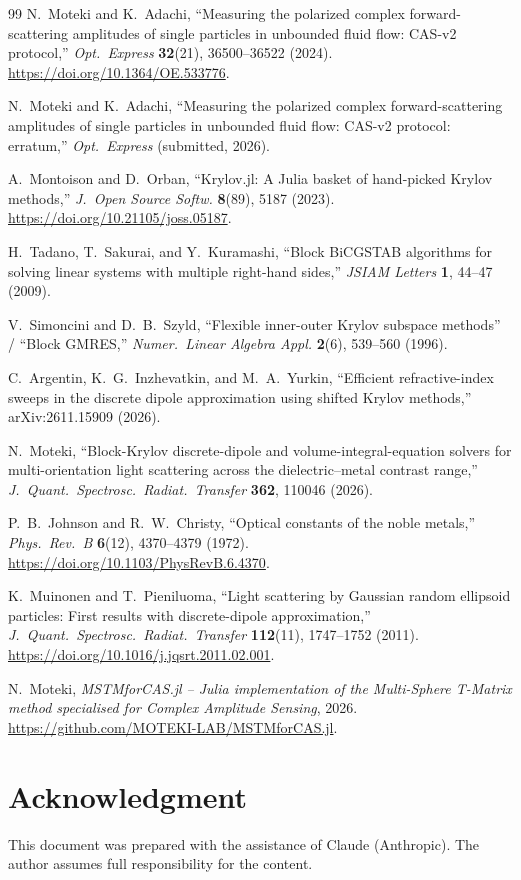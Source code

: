 \documentclass[11pt,a4paper]{article}
\begin{document}
\begin{thebibliography}{99}
  N.~Moteki and K.~Adachi,
  ``Measuring the polarized complex forward-scattering amplitudes of
  single particles in unbounded fluid flow: CAS-v2 protocol,''
  \textit{Opt.\ Express} \textbf{32}(21), 36500--36522 (2024).
  \url{https://doi.org/10.1364/OE.533776}.

  N.~Moteki and K.~Adachi,
  ``Measuring the polarized complex forward-scattering amplitudes of
  single particles in unbounded fluid flow: CAS-v2 protocol: erratum,''
  \textit{Opt.\ Express} (submitted, 2026).

  A.~Montoison and D.~Orban,
  ``Krylov.jl: A Julia basket of hand-picked Krylov methods,''
  \textit{J.\ Open Source Softw.} \textbf{8}(89), 5187 (2023).
  \url{https://doi.org/10.21105/joss.05187}.

  H.~Tadano, T.~Sakurai, and Y.~Kuramashi,
  ``Block BiCGSTAB algorithms for solving linear systems with multiple
  right-hand sides,''
  \textit{JSIAM Letters} \textbf{1}, 44--47 (2009).

  V.~Simoncini and D.~B.~Szyld,
  ``Flexible inner-outer Krylov subspace methods'' / ``Block GMRES,''
  \textit{Numer.\ Linear Algebra Appl.} \textbf{2}(6), 539--560 (1996).

  C.~Argentin, K.~G.~Inzhevatkin, and M.~A.~Yurkin,
  ``Efficient refractive-index sweeps in the discrete dipole approximation
  using shifted Krylov methods,''
  arXiv:2611.15909 (2026).

  N.~Moteki,
  ``Block-Krylov discrete-dipole and volume-integral-equation solvers for
  multi-orientation light scattering across the dielectric--metal contrast
  range,''
  \textit{J.\ Quant.\ Spectrosc.\ Radiat.\ Transfer} \textbf{362},
  110046 (2026).

  P.~B.~Johnson and R.~W.~Christy,
  ``Optical constants of the noble metals,''
  \textit{Phys.\ Rev.\ B} \textbf{6}(12), 4370--4379 (1972).
  \url{https://doi.org/10.1103/PhysRevB.6.4370}.

  K.~Muinonen and T.~Pieniluoma,
  ``Light scattering by Gaussian random ellipsoid particles: First
  results with discrete-dipole approximation,''
  \textit{J.\ Quant.\ Spectrosc.\ Radiat.\ Transfer} \textbf{112}(11),
  1747--1752 (2011).
  \url{https://doi.org/10.1016/j.jqsrt.2011.02.001}.

  N.~Moteki, \textit{MSTMforCAS.jl -- Julia implementation of the
  Multi-Sphere T-Matrix method specialised for Complex Amplitude
  Sensing}, 2026.
  \url{https://github.com/MOTEKI-LAB/MSTMforCAS.jl}.

\end{thebibliography}

\section*{Acknowledgment}

This document was prepared with the assistance of Claude (Anthropic).
The author assumes full responsibility for the content.
\end{document}
